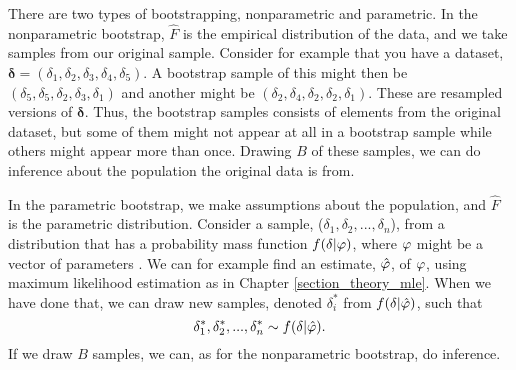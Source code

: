 


There are two types of bootstrapping, nonparametric and parametric. In the nonparametric bootstrap, $\hat{F}$ is the empirical distribution of the data, and we take samples from our original sample. Consider for example that you have a dataset, $\boldsymbol{\delta}=(\delta_1,\delta_2,\delta_3,\delta_4,\delta_{5})$. A bootstrap sample of this might then be $(\delta_5,\delta_5,\delta_2,\delta_3,\delta_1)$ and another might be $(\delta_2,\delta_{4},\delta_{2},\delta_{2},\delta_{1})$. These are resampled versions of $\boldsymbol{\delta}$. Thus, the bootstrap samples consists of elements from the original dataset, but some of them might not appear at all in a bootstrap sample while others might appear more than once. Drawing $B$ of these samples, we can do inference about the population the original data is from. 

In the parametric bootstrap, we make assumptions about the population, and $\hat{F}$ is the parametric distribution. Consider a sample, ($\delta_1,\delta_2,...,\delta_n$), from a distribution that has a probability mass function $f(\delta|\varphi)$, where $\varphi$ might be a vector of parameters \citep{statinf}. We can for example find an estimate, $\hat{\varphi}$, of $\varphi$, using maximum likelihood estimation as in Chapter \ref{section_theory_mle}. When we have done that, we can draw new samples, denoted $\delta_i^*$ from $f(\delta|\hat{\varphi})$, such that
\begin{equation*}
    \delta_1^*,\delta_2^*,...,\delta_n^* \sim f(\delta|\hat{\varphi}).
\end{equation*}
If we draw $B$ samples, we can, as for the nonparametric bootstrap, do inference. 



